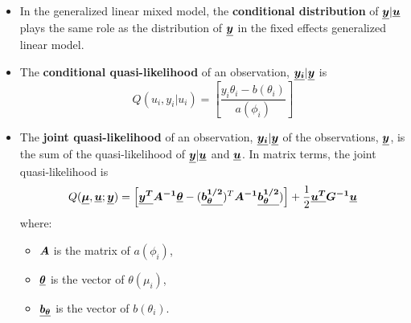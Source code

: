 \begin{frame}
  \begin{itemize}
    \vspace{0.75cm}
    \item In the generalized linear mixed model, the \textbf{conditional distribution} of $ \boldsymbol{\underline{y}}|\boldsymbol{\underline{u}} $ plays the same role as the distribution of $ \boldsymbol{\underline{y}} $ in the fixed effects generalized linear model.
    \vspace{0.75cm}
    \item The \textbf{conditional quasi-likelihood} of an observation, $ \boldsymbol{\underline{y_i}}|\boldsymbol{\underline{y}} $ is
      $$ Q(u_i, y_i|u_i) = \left[ \frac{y_i \theta_i - b(\theta_i)}{a(\phi_i)} \right] $$
  \end{itemize}
\end{frame}

\begin{frame}
  \begin{itemize}
    \vspace{0.75cm}
    \item The \textbf{joint quasi-likelihood} of an observation, $ \boldsymbol{\underline{y_i}}|\boldsymbol{\underline{y}} $ of the observations, $ \boldsymbol{\underline{y}} $, is the sum of the quasi-likelihood of $ \boldsymbol{\underline{y}}|\boldsymbol{\underline{u}} $ and $ \boldsymbol{\underline{u}} $. In matrix terms, the joint quasi-likelihood is
      $$ Q(\boldsymbol{\underline{\mu}}, \boldsymbol{\underline{u}}; \boldsymbol{\underline{y}}) = \left[ \boldsymbol{\underline{y^T}} \boldsymbol{A^{-1}} \boldsymbol{\underline{\theta}} - (\boldsymbol{\underline{b_{\theta}^{1/2}}})^T \boldsymbol{A^{-1}} \boldsymbol{\underline{b_{\theta}^{1/2}}}) \right] + \frac{1}{2} \boldsymbol{\underline{u^T}} \boldsymbol{G^{-1}} \boldsymbol{\underline{u}} $$
      where:
      \begin{itemize}
        \vspace{0.25cm}
        \item $ \boldsymbol{A} $ is the matrix of $ a(\phi_i) $,
        \vspace{0.25cm}
        \item $ \boldsymbol{\underline{\theta}} $ is the vector of $ \theta(\mu_i) $,
        \vspace{0.25cm}
        \item $ \boldsymbol{\underline{b_\theta}} $ is the vector of $ b(\theta_i) $.
      \end{itemize}
  \end{itemize}
\end{frame}




